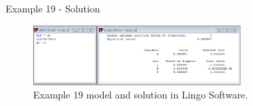 \begin{frame}{Example 19 - Solution}
\begin{figure}
    \includegraphics[width=300px]{slides/ex19/screenshot.png}
    \caption{Example 19 model and solution in Lingo Software.}
\end{figure}
\end{frame}
